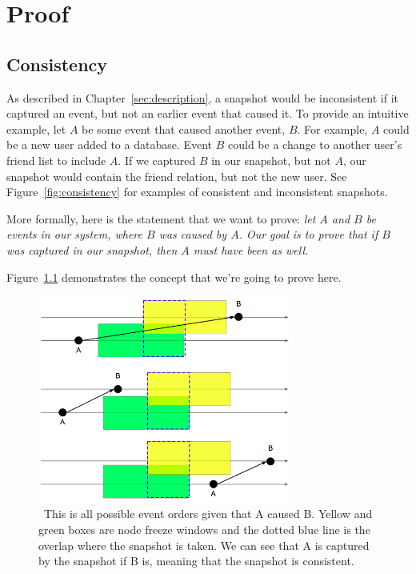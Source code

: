 \chapter{Proof}
\label{sec:proof}


\section{Consistency}

As described in Chapter~\ref{sec:description}, a snapshot would be
inconsistent if it captured an event, but not an earlier event that
caused it. To provide an intuitive example, let $A$ be some event that
caused another event, $B$.  For example, $A$ could be a new user added
to a database. Event $B$ could be a change to another user's friend
list to include $A$. If we captured $B$ in our snapshot, but not $A$,
our snapshot would contain the friend relation, but not the new
user. See Figure~\ref{fig:consistency} for examples of consistent and
inconsistent snapshots.

More formally, here is the statement that we want to prove: {\em let
  $A$ and $B$ be events in our system, where $B$ was caused by
  $A$. Our goal is to prove that if $B$ was captured in our snapshot,
  then $A$ must have been as well.}

Figure~\ref{fig:consistentoverlap} demonstrates the concept that we're
going to prove here.

\begin{figure}[!htbp]
  \centering
  \caption{~This is all possible event orders given that A caused B. Yellow and green boxes are node freeze windows and the dotted blue line is the overlap where the snapshot is taken. We can see that A is captured by the snapshot if B is, meaning that the snapshot is consistent.} 
  \label{fig:consistentoverlap}
  \includegraphics[width=0.75\textwidth]{consistentoverlap.png}
\end{figure}

